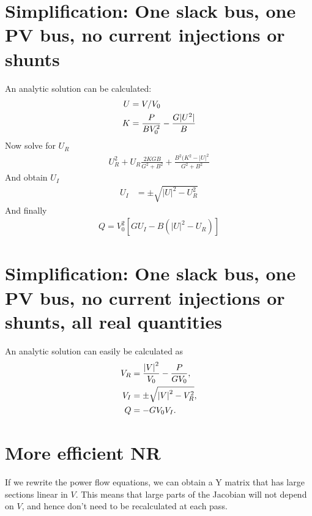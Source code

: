 \documentclass[11pt]{article}
\begin{document}
\section{Simplification: One slack bus, one PV bus, no current injections or shunts}
An analytic solution can be calculated:
\begin{align}
	U &= V/V_0 \notag \\
	K &= \frac{P}{BV_0^2}-\frac{G|U^2|}{B}
\end{align}
Now solve for $U_R$
\begin{align}
	U_R^2 + U_R\frac{2KGB}{G^2 + B^2}+\frac{B^2(K^2-|U|^2}{G^2+B^2}
\end{align}
And obtain $U_I$
\begin{align}
	U_I &= \pm\sqrt{|U|^2-U_R^2} 
\end{align}
And finally
\begin{align}
	Q = V_0^2\left[GU_I-B(|U|^2-U_R)\right]
\end{align}
\section{Simplification: One slack bus, one PV bus, no current injections or shunts, all real quantities}
An analytic solution can easily be calculated as
\begin{align}
	V_R &= \frac{\left|V\right|^2}{V_0}-\frac{P}{GV_0} ,\notag \\
	V_I &= \pm\sqrt{\left|V\right|^2 - V_R^2}, \notag \\
	Q &= -GV_0V_I.
\end{align}
\section{More efficient NR}
If we rewrite the power flow equations, we can obtain a Y matrix that has large sections linear in $V$. This means that large parts of the Jacobian will not depend on $V$, and hence don't need to be recalculated at each pass.
\end{document}
